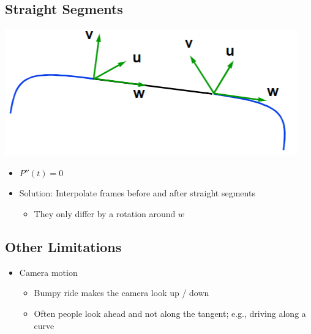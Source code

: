 \documentclass{article}
\begin{document}
\subsection*{Straight Segments}
\begin{center}
    \includegraphics*[scale=0.7]{W4_13.png}
\end{center}
\begin{itemize}
    \item $P''(t) = 0$
    \item Solution: Interpolate frames before and after straight segments
    \begin{itemize}
        \item They only differ by a rotation around $w$
    \end{itemize}
\end{itemize}

\subsection*{Other Limitations}
\begin{itemize}
    \item Camera motion
    \begin{itemize}
        \item Bumpy ride makes the camera look up / down
        \item Often people look ahead and not along the tangent; e.g., driving along a curve
    \end{itemize}
\end{itemize}
\end{document}

